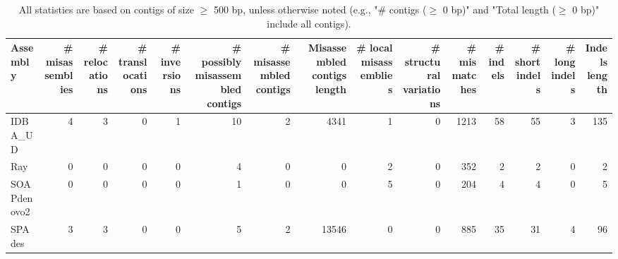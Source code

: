 \documentclass[12pt,a4paper]{article}
\begin{document}
\begin{table}[ht]
\begin{center}
\caption{All statistics are based on contigs of size $\geq$ 500 bp, unless otherwise noted (e.g., "\# contigs ($\geq$ 0 bp)" and "Total length ($\geq$ 0 bp)" include all contigs).}
\begin{tabular}{|l*{14}{|r}|}
\hline
Assembly & \# misassemblies &     \# relocations &     \# translocations &     \# inversions & \# possibly misassembled contigs & \# misassembled contigs & Misassembled contigs length & \# local misassemblies & \# structural variations & \# mismatches & \# indels &     \# short indels &     \# long indels & Indels length \\ \hline
IDBA\_UD & 4 & 3 & 0 & 1 & 10 & 2 & 4341 & 1 & 0 & 1213 & 58 & 55 & 3 & 135 \\ \hline
Ray & 0 & 0 & 0 & 0 & 4 & 0 & 0 & 2 & 0 & 352 & 2 & 2 & 0 & 2 \\ \hline
SOAPdenovo2 & 0 & 0 & 0 & 0 & 1 & 0 & 0 & 5 & 0 & 204 & 4 & 4 & 0 & 5 \\ \hline
SPAdes & 3 & 3 & 0 & 0 & 5 & 2 & 13546 & 0 & 0 & 885 & 35 & 31 & 4 & 96 \\ \hline
\end{tabular}
\end{center}
\end{table}
\end{document}
